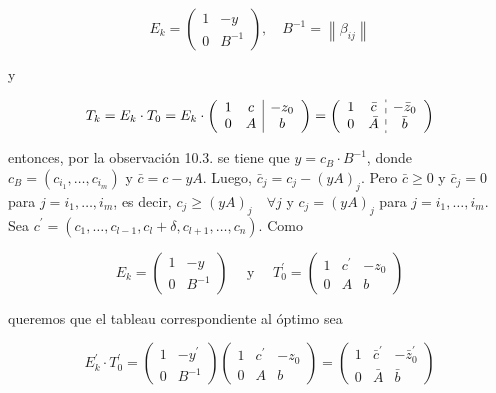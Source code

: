 \documentclass[10pt]{article}
\begin{document}
$$
E_{k}=\left(\begin{array}{cc}
1 & -y \\
0 & B^{-1}
\end{array}\right), \quad B^{-1}=\left\|\beta_{i j}\right\|
$$

y

$$
T_{k}=E_{k} \cdot T_{0}=E_{k} \cdot\left(\begin{array}{cc|c}
1 & c & -z_{0} \\
0 & A & b
\end{array}\right)=\left(\begin{array}{cc:c}
1 & \bar{c} & -\bar{z}_{0} \\
0 & \bar{A} & \bar{b}
\end{array}\right)
$$

entonces, por la observación 10.3. se tiene que $y=c_{B} \cdot B^{-1}$, donde $c_{B}=\left(c_{i_{1}}, \ldots, c_{i_{m}}\right)$ y $\bar{c}=c-y A$. Luego, $\bar{c}_{j}=c_{j}-(y A)_{j}$. Pero $\bar{c} \geq 0$ y $\bar{c}_{j}=0$ para $j=i_{1}, \ldots, i_{m}$, es decir, $c_{j} \geq(y A)_{j} \quad \forall j$ y $c_{j}=(y A)_{j}$ para $j=i_{1}, \ldots, i_{m}$.\\
Sea $c^{\prime}=\left(c_{1}, \ldots, c_{l-1}, c_{l}+\delta, c_{l+1}, \ldots, c_{n}\right)$. Como

$$
E_{k}=\left(\begin{array}{cc}
1 & -y \\
0 & B^{-1}
\end{array}\right) \quad \text { y } \quad T_{0}^{\prime}=\left(\begin{array}{cc|c}
1 & c^{\prime} & -z_{0} \\
0 & A & b
\end{array}\right)
$$

queremos que el tableau correspondiente al óptimo sea

$$
E_{k}^{\prime} \cdot T_{0}^{\prime}=\left(\begin{array}{cc}
1 & -y^{\prime} \\
0 & B^{-1}
\end{array}\right)\left(\begin{array}{cc|c}
1 & c^{\prime} & -z_{0} \\
0 & A & b
\end{array}\right)=\left(\begin{array}{cc|c}
1 & \bar{c}^{\prime} & -\bar{z}_{0}^{\prime} \\
0 & \bar{A} & \bar{b}
\end{array}\right)
$$
\end{document}
